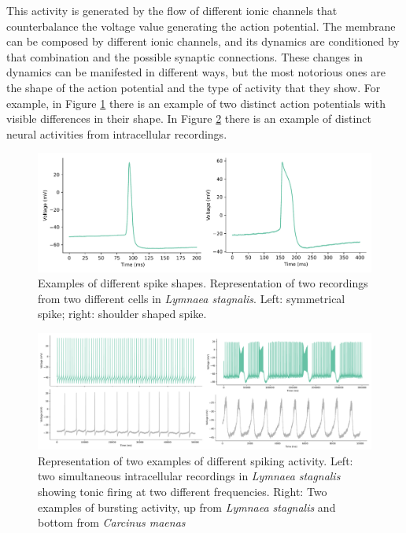 This activity is generated by the flow of different ionic channels that counterbalance the voltage value generating the action potential. The membrane can be composed by different ionic channels, and its dynamics are conditioned by that combination and the possible synaptic connections. These changes in dynamics can be manifested in different ways, but the most notorious ones are the shape of the action potential and the type of activity that they show. %
For example, in Figure \ref{fig:spike-types} there is an example of two distinct action potentials with visible differences in their shape. In Figure \ref{fig:spike_activity-types} there is an example of distinct neural activities from intracellular recordings. 
\begin{figure}[htb!]
    \centering
    \includegraphics[width=\linewidth]{img/intro/spike-types.pdf}
    \caption{Examples of different spike shapes. Representation of two recordings from two different cells in \textit{Lymnaea stagnalis}. Left: symmetrical spike; right: shoulder shaped spike.}
    \label{fig:spike-types}
\end{figure}
\begin{figure}[htb!]
    \centering
    \includegraphics[width=\linewidth]{img/intro/spike_activity-types.pdf}
    \caption{Representation of two examples of different spiking activity. Left: two simultaneous intracellular recordings in \textit{Lymnaea stagnalis} showing tonic firing at two different frequencies. Right: Two examples of bursting activity, up from \textit{Lymnaea stagnalis} and bottom from \textit{Carcinus maenas}}
    \label{fig:spike_activity-types}
\end{figure}

